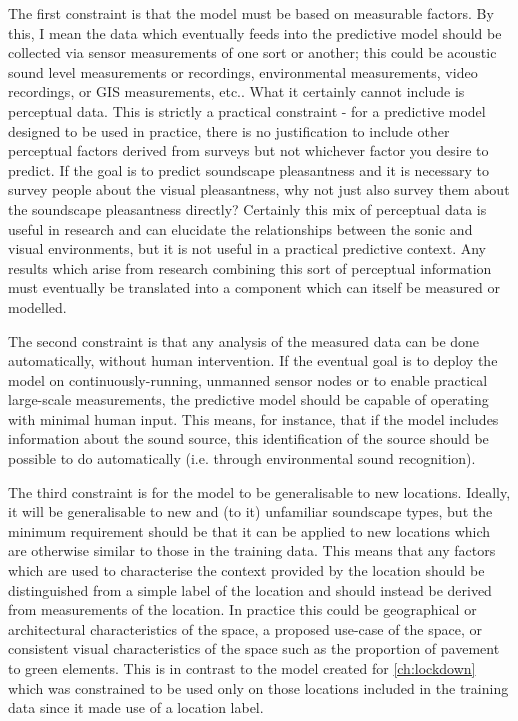 The first constraint is that the model must be based on measurable factors. By this, I mean the data which eventually feeds into the predictive model should be collected via sensor measurements of one sort or another; this could be acoustic sound level measurements or recordings, environmental measurements, video recordings, or GIS measurements, etc.. What it certainly cannot include is perceptual data. This is strictly a practical constraint - for a predictive model designed to be used in practice, there is no justification to include other perceptual factors derived from surveys but not whichever factor you desire to predict. If the goal is to predict soundscape pleasantness and it is necessary to survey people about the visual pleasantness, why not just also survey them about the soundscape pleasantness directly? Certainly this mix of perceptual data is useful in research and can elucidate the relationships between the sonic and visual environments, but it is not useful in a practical predictive context. Any results which arise from research combining this sort of perceptual information must eventually be translated into a component which can itself be measured or modelled.

The second constraint is that any analysis of the measured data can be done automatically, without human intervention. If the eventual goal is to deploy the model on continuously-running, unmanned sensor nodes or to enable practical large-scale measurements, the predictive model should be capable of operating with minimal human input. This means, for instance, that if the model includes information about the sound source, this identification of the source should be possible to do automatically (i.e. through environmental sound recognition). 

The third constraint is for the model to be generalisable to new locations. Ideally, it will be generalisable to new and (to it) unfamiliar soundscape types, but the minimum requirement should be that it can be applied to new locations which are otherwise similar to those in the training data. This means that any factors which are used to characterise the context provided by the location should be distinguished from a simple label of the location and should instead be derived from measurements of the location. In practice this could be geographical or architectural characteristics of the space, a proposed use-case of the space, or consistent visual characteristics of the space such as the proportion of pavement to green elements. This is in contrast to the model created for \cref{ch:lockdown} which was constrained to be used only on those locations included in the training data since it made use of a location label.


